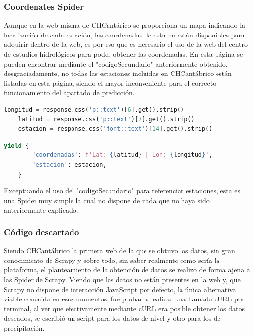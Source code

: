 \subsubsection{Coordenates Spider}
Aunque en la web misma de CHCantárico se proporciona un mapa indicando la localización de cada estación, las coordenadas de esta no están disponibles para adquirir dentro de la web, es por eso que es necesario el uso de la web del centro de estudios hidrológicos para poder obtener las coordenadas.\newline
\newline
En esta página se pueden encontrar mediante el "codigoSecundario" anteriormente obtenido, desgraciadamente, no todas las estaciones incluidas en CHCantábrico están listadas en esta página, siendo el mayor inconveniente para el correcto funcionamiento del apartado de predicción.

\begin{lstlisting}[language=Python, caption={Selector en \textit{parse()} de CHCantábrico Coordinates Spider}]
	longitud = response.css('p::text')[6].get().strip()
	latitud = response.css('p::text')[7].get().strip()
	estacion = response.css('font::text')[14].get().strip()
\end{lstlisting}

\begin{lstlisting}[language=Python, caption={Guardado de datos de CHCantábrico Coordinates Spider}]
	yield {
		'coordenadas': f'Lat: {latitud} | Lon: {longitud}',
		'estacion': estacion,
	}
\end{lstlisting}

Exceptuando el uso del "codigoSecundario" para referenciar estaciones, esta es una Spider muy simple la cual no dispone de nada que no haya sido anteriormente explicado.

\subsubsection{Código descartado}
Siendo CHCantábrico la primera web de la que se obtuvo los datos, sin gran conocimiento de Scrapy y sobre todo, sin saber realmente como sería la plataforma, el planteamiento de la obtención de datos se realizo de forma ajena a las Spider de Scrapy.\newline
\newline
Viendo que los datos no están presentes en la web y, que Scrapy no dispone de interacción JavaScript por defecto, la única alternativa viable conocida en esos momentos, fue probar a realizar una llamada cURL por terminal, al ver que efectivamente mediante cURL era posible obtener los datos deseados, se escribió un script para los datos de nivel y otro para los de precipitación.

